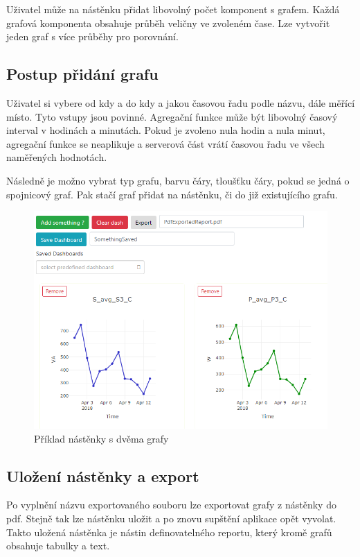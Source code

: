 \documentclass[FM,BP]{tulthesis}
\begin{document}
        Uživatel může na nástěnku přidat libovolný počet komponent s grafem. 
        Každá grafová komponenta obsahuje průběh veličny ve zvoleném čase. 
        Lze vytvořit jeden graf s více průběhy pro porovnání.

        \subsection{Postup přidání grafu}
            Uživatel si vybere od kdy a do kdy a jakou časovou řadu podle názvu, dále měřící místo. Tyto vstupy jsou povinné.
            Agregační funkce může být libovolný časový interval v hodinách a minutách. Pokud je zvoleno nula hodin a nula minut, 
            agregační funkce se neaplikuje a serverová část vrátí časovou řadu ve všech naměřených hodnotách.

            Následně je možno vybrat typ grafu, barvu čáry, tloušťku čáry, pokud se jedná o spojnicový graf.
            Pak stačí graf přidat na nástěnku, či do již existujícího grafu.
        
            \begin{figure}[h]
                \centering
                \includegraphics[scale=0.80]{pic/example1.PNG}
                \caption{Příklad nástěnky s dvěma grafy} \label{Obrázek č. 3}
            \end{figure}

        \subsection{Uložení nástěnky a export}
            Po vyplnění názvu exportovaného souboru lze exportovat grafy z nástěnky do pdf. 
            Stejně tak lze nástěnku uložit a po znovu supštění aplikace opět vyvolat.
            Takto uložená nástěnka je nástin definovatelného reportu, který kromě grafů obsahuje tabulky a text.
            
\end{document}
